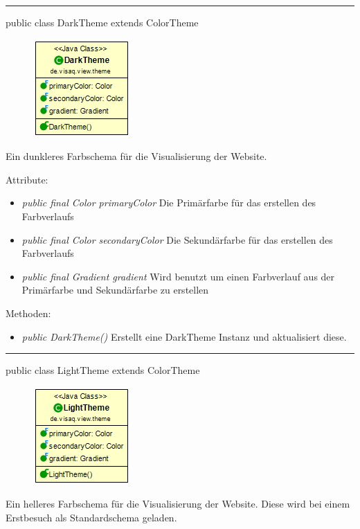 \rule{\textwidth}{0.4pt} 
public class DarkTheme extends ColorTheme

\begin{minipage}{0.3\textwidth}
    \begin{figure}[H]
        \includegraphics[scale = 0.5]{media/frontend/view/de.view.elements.theme/DarkTheme_Class.png}
    \end{figure}
    \end{minipage} \hfill
    \begin{minipage}{0.6\textwidth}
       Ein dunkleres Farbschema für die Visualisierung der Website.
    \end{minipage}

Attribute:
\begin{itemize}
    \item \emph{public final Color primaryColor} Die Primärfarbe für das erstellen des Farbverlaufs
    \item \emph{public final Color secondaryColor} Die Sekundärfarbe für das erstellen des Farbverlaufs
    \item \emph{public final Gradient gradient} Wird benutzt um einen Farbverlauf aus der Primärfarbe und Sekundärfarbe zu erstellen
\end{itemize}
Methoden:
\begin{itemize} 
    \item \emph{public DarkTheme()} Erstellt eine DarkTheme Instanz und aktualisiert diese.
\end{itemize}

\rule{\textwidth}{0.4pt} 
public class LightTheme extends ColorTheme

\begin{minipage}{0.3\textwidth}
    \begin{figure}[H]
        \includegraphics[scale = 0.5]{media/frontend/view/de.view.elements.theme/LightTheme_Class.png}
    \end{figure}
    \end{minipage} \hfill
    \begin{minipage}{0.6\textwidth}
        Ein helleres Farbschema für die Visualisierung der Website. Diese wird bei einem Erstbesuch als Standardschema geladen.
    \end{minipage}

